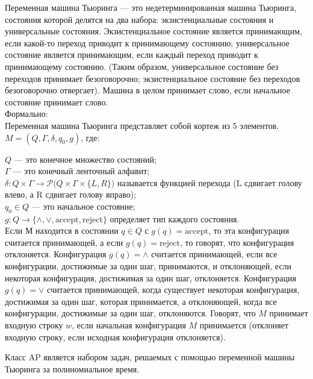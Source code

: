     \begin{Def}
        Переменная машина Тьюринга — это недетерминированная машина Тьюринга, состояния которой делятся на два набора: экзистенциальные состояния и универсальные состояния. Экзистенциальное состояние является принимающим, если какой-то переход приводит к принимающему состоянию; универсальное состояние является принимающим, если каждый переход приводит к принимающему состоянию. (Таким образом, универсальное состояние без переходов принимает безоговорочно; экзистенциальное состояние без переходов безоговорочно отвергает). Машина в целом принимает слово, если начальное состояние принимает слово.\\
        Формально:\\
        Переменная машина Тьюринга представляет собой кортеж из 5 элементов. $M = (Q, \Gamma, \delta, q_{0}, g)$, где:

        $Q$ --- это конечное множество состояний;\\
        $\Gamma$ --- это конечный ленточный алфавит;\\
        $\delta : Q \times \Gamma \rightarrow {\mathcal {P}(Q\times\Gamma\times\{L,R\}})$ называется функцией перехода (L сдвигает голову влево, а R сдвигает голову вправо);\\
        $q_{0} \in Q$ --- это начальное состояние;\\
        $g : Q \rightarrow \{\wedge, \vee, \text{accept}, \text{reject} \}$ определяет тип каждого состояния.\\
        Если М находится в состоянии $q\in Q$ с $g(q) = \text{accept}$, то эта конфигурация считается принимающей, а если $g(q) = \text{reject}$, то говорят, что конфигурация отклоняется. Конфигурация $g(q) = \wedge$ считается принимающей, если все конфигурации, достижимые за один шаг, принимаются, и отклоняющей, если некоторая конфигурация, достижимая за один шаг, отклоняется. Конфигурация $g(q) = \vee$ считается принимающей, когда существует некоторая конфигурация, достижимая за один шаг, которая принимается, а отклоняющей, когда все конфигурации, достижимые за один шаг, отклоняются. Говорят, что $M$ принимает входную строку $w$, если начальная конфигурация $M$ принимается (отклоняет входную строку, если исходная конфигурация отклоняется).
    \end{Def}
    \begin{Def}[Класс AP]
        Класс AP является набором задач, решаемых с помощью переменной машины Тьюринга за полиномиальное время.
    \end{Def}

